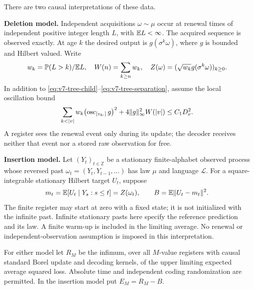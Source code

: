 There are two causal interpretations of these data.

\smallskip\noindent
\textbf{Deletion model.} Independent acquisitions $\omega\sim\mu$ occur
at renewal times of independent positive integer length $L$, with
$\mathbb E L<\infty$. The acquired sequence is observed exactly. At age $k$
the desired output is $g(\sigma^k\omega)$, where $g$ is bounded and
Hilbert valued. Write
\[
 w_k=\mathbb P(L>k)/\mathbb E L,\quad W(n)=\sum_{k\ge n}w_k,
 \quad Z(\omega)=(\sqrt{w_k}g(\sigma^k\omega))_{k\ge0}.
\]
In addition to \eqref{eq:v7-tree-child}--\eqref{eq:v7-tree-separation},
assume the local oscillation bound
\begin{equation}
 \sum_{k<|v|}w_k\bigl(\osc_{[v_{k:}]}g\bigr)^2
       +4\|g\|_\infty^2W(|v|)\le C_1D_v^2.          \label{eq:v7-deletion-osc}
\end{equation}
A register sees the renewal event only during its update; the decoder
receives neither that event nor a stored raw observation for free.

\smallskip\noindent
\textbf{Insertion model.} Let $(Y_t)_{t\in\mathbb Z}$ be a stationary
finite-alphabet observed process whose reversed past
$\omega_t=(Y_t,Y_{t-1},\ldots)$ has law $\mu$ and language $\mathcal L$.
For a square-integrable stationary Hilbert target $U_t$, suppose
\begin{equation}
 m_t=\mathbb E[U_t\mid Y_s:s\le t]=Z(\omega_t),\qquad
 B=\mathbb E\|U_t-m_t\|^2.                                 \label{eq:v7-past-mean}
\end{equation}
The finite register may start at zero with a fixed state; it is not
initialized with the infinite past. Infinite stationary pasts here
specify the reference prediction and its law. A finite warm-up is
included in the limiting average. No renewal or independent-observation
assumption is imposed in this interpretation.

For either model let $R_M$ be the infimum, over all $M$-value registers
with causal standard Borel update and decoding kernels, of the upper
limiting expected average squared loss. Absolute time and independent
coding randomization are permitted. In the insertion model put
$E_M=R_M-B$.

